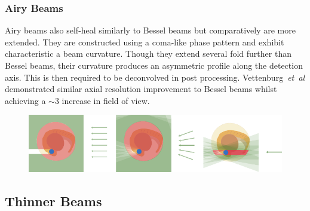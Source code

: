 \subsubsection{Airy Beams}
Airy beams also self-heal similarly to Bessel beams but comparatively are more extended.
They are constructed using a coma-like phase pattern and exhibit characteristic a beam curvature.
Though they extend several fold further than Bessel beams, their curvature produces an asymmetric profile along the detection axis.
This is then required to be deconvolved in post processing.
Vettenburg~\emph{et~al}\cite{vettenburg_light-sheet_2014} demonstrated similar axial resolution improvement to Bessel beams whilst achieving a $\sim 3$ increase in field of view.

\begin{figure}
	\centering
	\label{fig:scatteringandshadowing}
	\includegraphics[width=0.8\linewidth]{./exotic_beams_cartoon}
    \caption{}
\end{figure}
\subsection{Thinner Beams}

